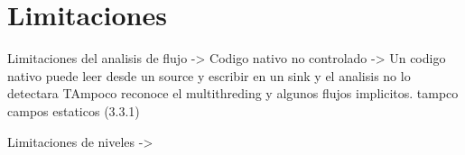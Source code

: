 
\chapter{Limitaciones}

Limitaciones del analisis de flujo -> Codigo nativo no controlado -> Un codigo nativo puede leer desde un source y escribir en un sink y el analisis no lo detectara
													TAmpoco reconoce el multithreding y algunos flujos implicitos. tampco campos estaticos (3.3.1)
													
Limitaciones de niveles -> 